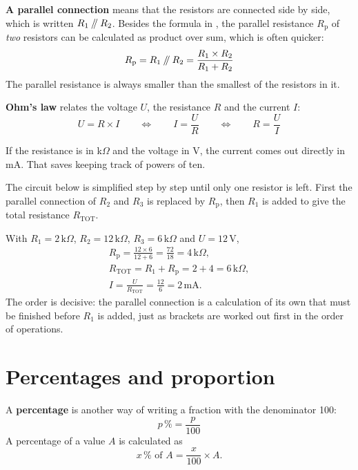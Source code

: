 \textbf{A parallel connection} means that the resistors are connected side by side, which is
written $R_1 \mathbin{/\mkern-5mu/} R_2$. Besides the formula in , the parallel
resistance $R_{\text{p}}$ of \emph{two} resistors can be calculated as product over sum, which is
often quicker:
\[
  R_{\text{p}} = R_1 \mathbin{/\mkern-5mu/} R_2 = \frac{R_1 \times R_2}{R_1 + R_2}
\]
The parallel resistance is always smaller than the smallest of the resistors in it.

\textbf{Ohm's law} relates the voltage $U$, the resistance $R$ and the current $I$:
\[
  U = R \times I
  \qquad \Leftrightarrow \qquad
  I = \frac{U}{R}
  \qquad \Leftrightarrow \qquad
  R = \frac{U}{I}
\]

\begin{aside}
\note[Tip] If the resistance is in k$\Omega$ and the voltage in V, the current comes out directly
in mA. That saves keeping track of powers of ten.
\end{aside}

\begin{exempel}
The circuit below is simplified step by step until only one resistor is left. First the parallel
connection of $R_2$ and $R_3$ is replaced by $R_{\text{p}}$, then $R_1$ is added to give the total
resistance $R_{\text{TOT}}$.


With $R_1 = 2\,\text{k}\Omega$, $R_2 = 12\,\text{k}\Omega$, $R_3 = 6\,\text{k}\Omega$ and
$U = 12\,\text{V}$,
\begin{gather*}
  R_{\text{p}} = \frac{12 \times 6}{12 + 6} = \frac{72}{18} = 4\,\text{k}\Omega, \\
  R_{\text{TOT}} = R_1 + R_{\text{p}} = 2 + 4 = 6\,\text{k}\Omega, \\
  I = \frac{U}{R_{\text{TOT}}} = \frac{12}{6} = 2\,\text{mA}.
\end{gather*}
The order is decisive: the parallel connection is a calculation of its own that must be finished
before $R_1$ is added, just as brackets are worked out first in the order of operations.
\end{exempel}

\section{Percentages and proportion}
\label{c1:sec:procent}
A \textbf{percentage} is another way of writing a fraction with the denominator 100:
\[
  p\,\% = \frac{p}{100}
\]
A percentage of a value $A$ is calculated as
\[
  x\,\% \text{ of } A = \frac{x}{100} \times A.
\]

